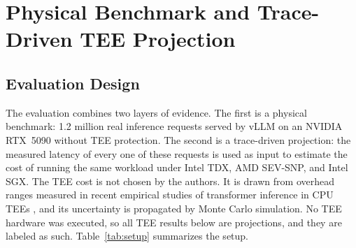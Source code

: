 \documentclass{ieeeaccess}
\begin{document}
\section{Physical Benchmark and Trace-Driven TEE Projection}
\label{sec:eval}

\subsection{Evaluation Design}

The evaluation combines two layers of evidence. The first is a physical
benchmark: 1.2 million real inference requests served by vLLM on an NVIDIA
RTX~5090 without TEE protection. The second is a trace-driven projection: the
measured latency of every one of these requests is used as input to estimate
the cost of running the same workload under Intel TDX, AMD SEV-SNP, and Intel
SGX. The TEE cost is not chosen by the authors. It is drawn from overhead
ranges measured in recent empirical studies of transformer inference in CPU
TEEs \cite{chrapek2025confidential, misono2024cvm}, and its uncertainty is
propagated by Monte Carlo simulation. No TEE hardware was executed, so all
TEE results below are projections, and they are labeled as such.
Table~\ref{tab:setup} summarizes the setup.
\end{document}
